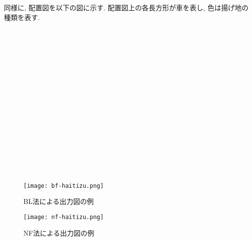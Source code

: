 同様に, 配置図を以下の図に示す. 
配置図上の各長方形が車を表し, 色は揚げ地の種類を表す. \\ 
\\ \\ \\ \\ \\ \\ \\ \\ \\ \\ \\ \\ \\ 
\\ \\ \\ 



\begin{figure}[h]
    \texttt{[image: bf-haitizu.png]}
    \caption{BL法による出力図の例}
    \label{second-no-rei}
\end{figure}


\begin{figure}[b]
    \texttt{[image: nf-haitizu.png]}
    \caption{NF法による出力図の例}
    \label{nf-norei}
\end{figure}

